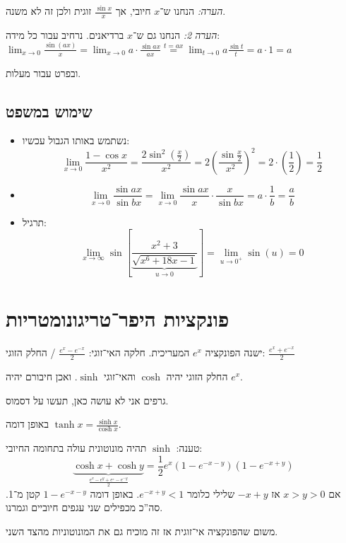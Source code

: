 \documentclass[]{article}
\newcommand\cosx  {\cos x}
\newcommand\sinx  {\sin x}
\newcommand\limz  {\lim_{x \to 0}}
\renewcommand\inf {\infty}
\begin{document}
	\textit{הערה: }הנחנו ש־$x$ חיובי, אך $\frac{\sinx}{x}$ זוגית ולכן זה לא משנה. 
	
	\textit{הערה 2: }הנחנו גם ש־$x$ ברדיאנים. נרחיב עבור כל מידה: $\limz \frac{\sin(ax)}{x} = \limz a \cdot \frac{\sin ax}{ax}\overset{t = ax}{=} \lim_{t \to 0}a \frac{\sin t}{t} = a \cdot 1 = a$
	
	ובפרט עבור מעלות. 
	
	\subsection{שימוש במשפט}
	\begin{itemize}
		\item נשתמש באותו הגבול עכשיו: 
		\[ \lim_{x \to 0} \frac{1 - \cosx }{x^2} = \frac{2\sin^2 \left (\frac{x}{2}\right )}{x^2} = 2 \left (\frac{\sin \frac{x}{2}}{x^2} \right )^2 = 2 \cdot \left (\frac{1}{2} \right ) = \frac{1}{2} \] 
		\item 
		\[ \limz \frac{\sin ax}{\sin bx} = \limz \frac{\sin ax}{x} \cdot \frac{x}{\sin bx} = a \cdot \frac{1}{b} = \frac{a}{b} \]
		\item תרגיל: 
		\[ \lim_{x \to \inf} \sin \left [\underbrace{\frac{x^2 + 3}{\sqrt{x^6 + 18x - 1}}}_{u \to 0}\right ] = \lim_{u \to 0^+} \sin (u) = 0 \]
	\end{itemize}
	
	\section{פונקציות היפר־טריגונומטריות}
	ישנה הפונקציה $e^x$ המעריכית. 
	חלקה האי־זוגי: $\frac{e^x - e^{-x}}{2}$ / החלק הזוגי: $ \frac{e^x + e^{-x}}{2} $
	
	החלק הזוגי יהיה $\cosh$ והאי־זוגי $\sinh$. ואכן חיבורם יהיה $e^x$. 
	
	גרפים אני לא עושה כאן, תעשו על דסמוס. 
	
	באופן דומה $\tanh x = \frac{\sinh x}{\cosh x}$. 
	
	טענה: $\sinh$ תהיה מונוטונית עולה בתחומה החיובי: 
	\[ \underbrace{\cosh x+ \cosh y}_{\frac{e^x - e^y + e^{_x} - e^{-y}}{2}} = \frac{1}{2}e^x(1 - e^{-x - y})(1 - e^{-x + y}) \] 
	אם $x > y > 0$ אז $-x + y $ שלילי כלומר $e^{-x + y } < 1 $. באופן דומה $1 - e^{-x - y }$ קטן מ־1. סה''כ מכפילים שני עגפים חיוביים וגמרנו. 
	
	משום שהפונקציה אי־זוגית אז זה מוכיח גם את המונוטוניות מהצד השני. 
\end{document}
